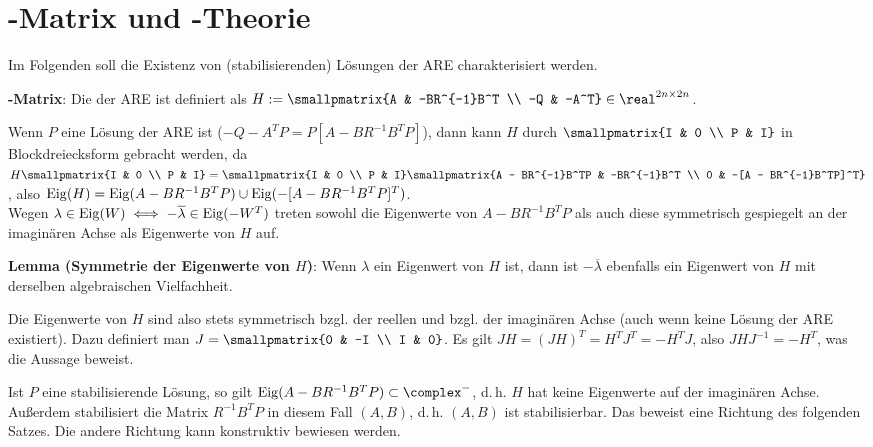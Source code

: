 \pagebreak

\section{%
    -Matrix und -Theorie%
}

Im Folgenden soll die Existenz von (stabilisierenden) Lösungen der ARE charakterisiert werden.

\textbf{-Matrix}:
Die  der ARE ist definiert als
$H := \smallpmatrix{A & -BR^{-1}B^T \\ -Q & -A^T} \in \real^{2n \times 2n}$.

Wenn $P$ eine Lösung der ARE ist ($-Q - A^T P = P[A - BR^{-1}B^T P]$),
dann kann $H$ durch $\smallpmatrix{I & 0 \\ P & I}$ in Blockdreiecksform gebracht werden,
da $H \smallpmatrix{I & 0 \\ P & I}
= \smallpmatrix{I & 0 \\ P & I}
\smallpmatrix{A - BR^{-1}B^TP & -BR^{-1}B^T \\ 0 & -[A - BR^{-1}B^TP]^T}$,
also $\operatorname{Eig}(H) = \operatorname{Eig}(A - BR^{-1}B^TP) \cup \operatorname{Eig}(-[A - BR^{-1}B^TP]^T)$.\\
Wegen $\lambda \in \operatorname{Eig}(W) \iff -\overline{\lambda} \in \operatorname{Eig}(-W^T)$ treten
sowohl die Eigenwerte von $A - BR^{-1}B^TP$ als auch
diese symmetrisch gespiegelt an der imaginären Achse
als Eigenwerte von $H$ auf.

\textbf{Lemma (Symmetrie der Eigenwerte von $H$)}:
Wenn $\lambda$ ein Eigenwert von $H$ ist,
dann ist $-\overline{\lambda}$ ebenfalls ein Eigenwert von $H$ mit derselben
algebraischen Vielfachheit.

Die Eigenwerte von $H$ sind also stets symmetrisch bzgl. der reellen und bzgl. der imaginären Achse
(auch wenn keine Lösung der ARE existiert).
Dazu definiert man $J = \smallpmatrix{0 & -I \\ I & 0}$.
Es gilt $JH = (JH)^T = H^T J^T = -H^T J$, also $JHJ^{-1} = -H^T$,
was die Aussage beweist.

\linie

Ist $P$ eine stabilisierende Lösung, so gilt
$\Eig(A - BR^{-1}B^TP) \subset \complex^-$, d.\,h. $H$ hat keine Eigenwerte auf der imaginären
Achse.
Außerdem stabilisiert die Matrix $R^{-1} B^T P$ in diesem Fall $(A, B)$,
d.\,h. $(A, B)$ ist stabilisierbar.
Das beweist eine Richtung des folgenden Satzes.
Die andere Richtung kann konstruktiv bewiesen werden.

